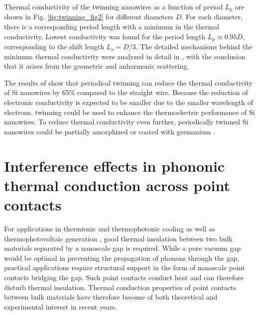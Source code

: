 Thermal conductivity of the twinning nanowires as a function of period $L_p$ are shown in Fig. \ref{fig:twinning_fig2} for different diameters $D$. For each diameter, there is a corresponding period length with a minimum in the thermal conductivity. Lowest conductivity was found for the period length $L_p\approx 0.95D$, corresponding to the shift length $L_s=D/3$. The detailed mechanisms behind the minimum thermal conductivity were analyzed in detail in , with the conclusion that it  arises from the  geometric and anharmonic scattering. 

The results of  show that periodical twinning can reduce the thermal conductivity of Si nanowires by 65\% compared to the straight wire.  Because the reduction of electronic conductivity is expected to be smaller due to the smaller wavelength of electrons, twinning could be used to enhance the thermoelectric performance of Si nanowires. To reduce thermal conductivity even further, periodically twinned Si nanowires could be partially amorphized \cite{donadio09} or coated with germanium \cite{hu11}. 

\section{Interference effects in phononic thermal conduction across point contacts}
\label{sec:results_interference}

For applications in thermionic \cite{zeng06}\cite{westover08} and thermophotonic \cite{oksanen08} cooling as well as thermophotovoltaic generation \cite{dimatteo01}, good thermal insulation between two bulk materials separated by a nanoscale gap is required. While a pure vacuum gap would be optimal in preventing the propagation of phonons through the gap, practical applications require structural support in the form of nanoscale point contacts bridging the gap. Such point contacts conduct heat and can therefore disturb thermal insulation. Thermal conduction properties of point contacts between bulk materials have therefore become of both theoretical \cite{saha07} and experimental \cite{bartsch12} interest in recent years.


